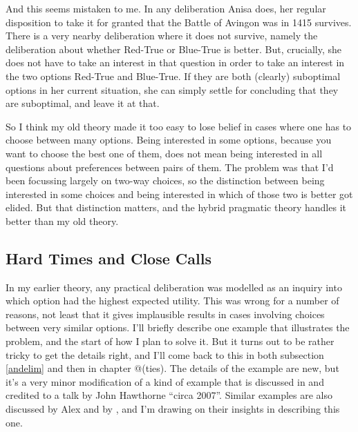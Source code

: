 \documentclass[11pt,]{book}
\begin{document}
And this seems mistaken to me. In any deliberation Anisa does, her regular disposition to take it for granted that the Battle of Avingon was in 1415 survives. There is a very nearby deliberation where it does not survive, namely the deliberation about whether Red-True or Blue-True is better. But, crucially, she does not have to take an interest in that question in order to take an interest in the two options Red-True and Blue-True. If they are both (clearly) suboptimal options in her current situation, she can simply settle for concluding that they are suboptimal, and leave it at that.

So I think my old theory made it too easy to lose belief in cases where one has to choose between many options. Being interested in some options, because you want to choose the best one of them, does not mean being interested in all questions about preferences between pairs of them. The problem was that I'd been focussing largely on two-way choices, so the distinction between being interested in some choices and being interested in which of those two is better got elided. But that distinction matters, and the hybrid pragmatic theory handles it better than my old theory.

\hypertarget{meties}{%
\subsection{Hard Times and Close Calls}\label{meties}}

In my earlier theory, any practical deliberation was modelled as an inquiry into which option had the highest expected utility. This was wrong for a number of reasons, not least that it gives implausible results in cases involving choices between very similar options. I'll briefly describe one example that illustrates the problem, and the start of how I plan to solve it. But it turns out to be rather tricky to get the details right, and I'll come back to this in both subsection \ref{andelim} and then in chapter @(ties). The details of the example are new, but it's a very minor modification of a kind of example that is discussed in \citet{McGrathKim2019} and credited to a talk by John Hawthorne ``circa 2007''. Similar examples are also discussed by Alex \citet{Zweber2016} and by \citet{AndersonHawthorne2019b}, and I'm drawing on their insights in describing this one.
\end{document}
